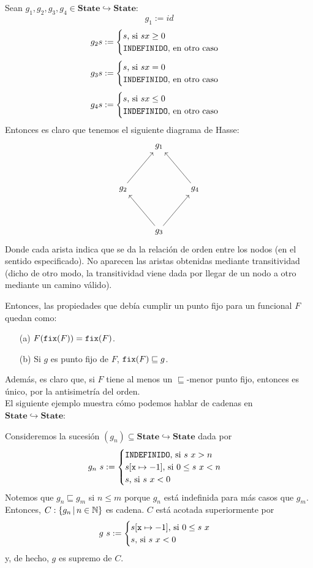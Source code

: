\begin{example}
Sean $g_1, g_2, g_3, g_4 \in \mathbf{State}\hookrightarrow \mathbf{State}$:
$$g_1 := id$$
$$g_2 s := \begin{cases}
    s \text{, si } sx \geq 0 \\
    \texttt{INDEFINIDO} \text{, en otro caso}
\end{cases}$$
$$g_3 s := \begin{cases}
    s \text{, si } sx = 0 \\
    \texttt{INDEFINIDO} \text{, en otro caso}
\end{cases}$$
$$g_4 s := \begin{cases}
    s \text{, si } sx \leq 0 \\
    \texttt{INDEFINIDO} \text{, en otro caso}
\end{cases}$$
Entonces es claro que tenemos el siguiente diagrama de Hasse: 
$$
\begin{tikzcd}
&g_1& \\
&& \\
g_2\arrow[uur]{} && g_4\arrow[uul]{} \\
&& \\
&g_3\arrow[uul]{} \arrow[uur]{}&
\end{tikzcd}
$$
Donde cada arista indica que se da la relación de orden entre los nodos (en el sentido especificado). No aparecen las aristas obtenidas mediante transitividad (dicho de otro modo, la transitividad viene dada por llegar de un nodo a otro mediante un camino válido).
\end{example}
Entonces, las propiedades que debía cumplir un punto fijo para un funcional $F$ quedan como: 
\begin{itemize}
    \item[(a)] $F(\texttt{fix}(F)) =  \texttt{fix}(F)$.
    \item[(b)] Si $g$ es punto fijo de $F$, $\texttt{fix}(F) \sqsubseteq g$.
\end{itemize}
Además, es claro que, si $F$ tiene al menos un $\sqsubseteq$-menor punto fijo, entonces es único, por la antisimetría del orden.
\\

El siguiente ejemplo muestra cómo podemos hablar de cadenas en $\mathbf{State}\hookrightarrow \mathbf{State}$:
\begin{example}
Consideremos la sucesión $(g_n)\subseteq \mathbf{State}\hookrightarrow \mathbf{State}$ dada por
$$g_n\ s := \begin{cases}
    \texttt{INDEFINIDO} \text{, si } s\ x > n \\
    s[\texttt{x} \mapsto -1] \text{, si } 0 \leq s\ x < n\\
    s \text{, si } s\ x < 0
\end{cases}$$
Notemos que $g_n \sqsubseteq g_m$ si $n \leq m$ porque $g_n$ está indefinida para más casos que $g_m$. Entonces, $C: \{g_n \, | \, n \in \mathbb{N}\}$ es cadena. $C$ está acotada superiormente por
$$g\ s := \begin{cases}
    s[\texttt{x} \mapsto -1] \text{, si } 0 \leq s\ x\\
    s \text{, si } s\ x < 0
\end{cases}$$
y, de hecho, $g$ es supremo de $C$.
\end{example}

